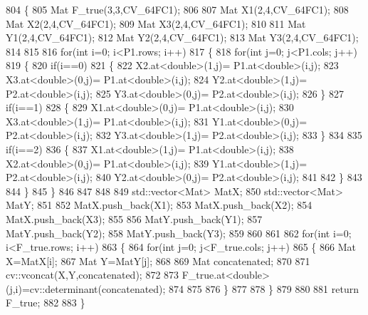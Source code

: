 \begin{DoxyCode}
804 \{
805     Mat F\_true(3,3,CV\_64FC1);
806 
807     Mat X1(2,4,CV\_64FC1);
808     Mat X2(2,4,CV\_64FC1);
809     Mat X3(2,4,CV\_64FC1);
810 
811     Mat Y1(2,4,CV\_64FC1);
812     Mat Y2(2,4,CV\_64FC1);
813     Mat Y3(2,4,CV\_64FC1);
814     
815 
816     \textcolor{keywordflow}{for}(\textcolor{keywordtype}{int} i=0; i<P1.rows; i++)
817     \{
818         \textcolor{keywordflow}{for}(\textcolor{keywordtype}{int} j=0; j<P1.cols; j++)
819         \{
820             \textcolor{keywordflow}{if}(i==0)
821             \{
822                 X2.at<\textcolor{keywordtype}{double}>(1,j)= P1.at<\textcolor{keywordtype}{double}>(i,j);
823                 X3.at<\textcolor{keywordtype}{double}>(0,j)= P1.at<\textcolor{keywordtype}{double}>(i,j);
824                 Y2.at<\textcolor{keywordtype}{double}>(1,j)= P2.at<\textcolor{keywordtype}{double}>(i,j);
825                 Y3.at<\textcolor{keywordtype}{double}>(0,j)= P2.at<\textcolor{keywordtype}{double}>(i,j);                    
826             \}
827             \textcolor{keywordflow}{if}(i==1)
828             \{
829                 X1.at<\textcolor{keywordtype}{double}>(0,j)= P1.at<\textcolor{keywordtype}{double}>(i,j);
830                 X3.at<\textcolor{keywordtype}{double}>(1,j)= P1.at<\textcolor{keywordtype}{double}>(i,j);
831                 Y1.at<\textcolor{keywordtype}{double}>(0,j)= P2.at<\textcolor{keywordtype}{double}>(i,j);
832                 Y3.at<\textcolor{keywordtype}{double}>(1,j)= P2.at<\textcolor{keywordtype}{double}>(i,j);                   
833             \}
834 
835             \textcolor{keywordflow}{if}(i==2)
836             \{
837                 X1.at<\textcolor{keywordtype}{double}>(1,j)= P1.at<\textcolor{keywordtype}{double}>(i,j);
838                 X2.at<\textcolor{keywordtype}{double}>(0,j)= P1.at<\textcolor{keywordtype}{double}>(i,j);
839                 Y1.at<\textcolor{keywordtype}{double}>(1,j)= P2.at<\textcolor{keywordtype}{double}>(i,j);
840                 Y2.at<\textcolor{keywordtype}{double}>(0,j)= P2.at<\textcolor{keywordtype}{double}>(i,j);
841 
842             \}
843 
844         \}
845     \}
846 
847 
848 
849     std::vector<Mat> MatX;
850     std::vector<Mat> MatY;
851 
852     MatX.push\_back(X1);
853     MatX.push\_back(X2);
854     MatX.push\_back(X3);
855 
856     MatY.push\_back(Y1);
857     MatY.push\_back(Y2);
858     MatY.push\_back(Y3);
859 
860 
861 
862     \textcolor{keywordflow}{for}(\textcolor{keywordtype}{int} i=0; i<F\_true.rows; i++)
863     \{
864         \textcolor{keywordflow}{for}(\textcolor{keywordtype}{int} j=0; j<F\_true.cols; j++)
865         \{
866             Mat X=MatX[i];
867             Mat Y=MatY[j];
868 
869             Mat concatenated;
870 
871             cv::vconcat(X,Y,concatenated);
872 
873             F\_true.at<\textcolor{keywordtype}{double}>(j,i)=cv::determinant(concatenated);
874 
875 
876         \}
877 
878     \}
879 
880 
881     \textcolor{keywordflow}{return} F\_true;
882 
883 \}
\end{DoxyCode}
